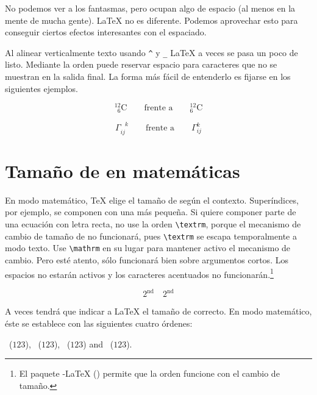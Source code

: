 No podemos ver a los fantasmas, pero ocupan algo de espacio (al menos en la mente de mucha gente). \LaTeX{} no es diferente.  Podemos aprovechar esto para conseguir ciertos efectos interesantes con el espaciado.

Al alinear verticalmente texto usando \verb|^| y \verb|_| \LaTeX{} a veces se pasa un poco de listo.  Mediante la orden  puede reservar espacio para caracteres que no se muestran en la salida final.  La forma más fácil de entenderlo es fijarse en los siguientes ejemplos.
\begin{example}
\begin{displaymath}
{}^{12}_{\phantom{1}6}\textrm{C}
\qquad \textrm{frente a} \qquad
{}^{12}_{6}\textrm{C}
\end{displaymath}
\end{example}
\begin{example}
\begin{displaymath} 
\Gamma_{ij}^{\phantom{ij}k}
\qquad \textrm{frente a} \qquad
\Gamma_{ij}^{k}
\end{displaymath}  
\end{example}

\section{Tamaño de \fontnomo{} en matemáticas}\label{sec:fontsz}

 En modo matemático, \TeX{} elige el tamaño de \fontnomo{} según el contexto.  Superíndices, por ejemplo, se componen con una \fontnomo{} más pequeña.  Si quiere componer parte de una ecuación con letra recta, no use la orden \verb|\textrm|, porque el mecanismo de cambio de tamaño de \fontnomo{} no funcionará, pues \verb|\textrm| se escapa temporalmente a modo texto.  Use \verb|\mathrm| en su lugar para mantener activo el mecanismo de cambio.  Pero esté atento,  sólo funcionará bien sobre argumentos cortos.  Los espacios no estarán activos y los caracteres acentuados no funcionarán.\footnote{El paquete  \AmS-\LaTeX{} () permite que la orden  funcione con el cambio de tamaño.}
\begin{example}
\begin{equation}
2^{\textrm{nd}} \quad 
2^{\mathrm{nd}}
\end{equation}
\end{example}

A veces tendrá que indicar a  \LaTeX{} el tamaño de \fontnomo{} correcto.  En modo matemático, éste se establece con las siguientes cuatro órdenes:
\begin{flushleft}
~($\displaystyle 123$),
 ~($\textstyle 123$), 
~($\scriptstyle 123$) and
~($\scriptscriptstyle 123$).
\end{flushleft}

